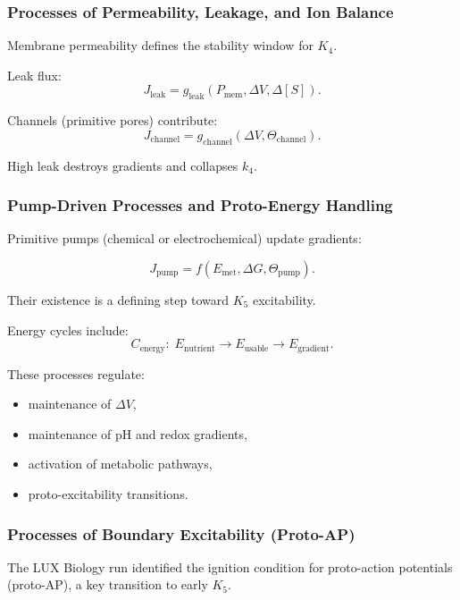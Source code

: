 \subsubsection{Processes of Permeability, Leakage, and Ion Balance}

Membrane permeability defines the stability window for $K_4$.

Leak flux:
\[
J_{\text{leak}} = g_\text{leak}(P_\text{mem}, \Delta V, \Delta[S]).
\]

Channels (primitive pores) contribute:
\[
J_{\text{channel}} = g_{\text{channel}}(\Delta V, \Theta_{\text{channel}}).
\]

High leak destroys gradients and collapses $k_4$.

\subsubsection{Pump-Driven Processes and Proto-Energy Handling}

Primitive pumps (chemical or electrochemical) update gradients:

\[
J_{\text{pump}} = f(E_{\text{met}}, \Delta G, \Theta_{\text{pump}}).
\]

Their existence is a defining step toward $K_5$ excitability.

Energy cycles include:
\[
C_\text{energy}: \;
E_\text{nutrient} \to E_\text{usable} \to E_\text{gradient}.
\]

These processes regulate:
\begin{itemize}
    \item maintenance of $\Delta V$,
    \item maintenance of pH and redox gradients,
    \item activation of metabolic pathways,
    \item proto-excitability transitions.
\end{itemize}

\subsubsection{Processes of Boundary Excitability (Proto-AP)}

The LUX Biology run identified the ignition condition for proto-action
potentials (proto-AP), a key transition to early $K_5$.

